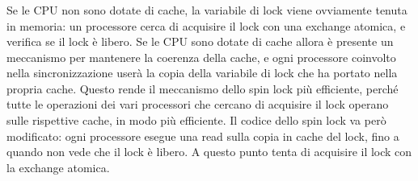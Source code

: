 \subsubsection{}
Se le CPU non sono dotate di cache, la variabile di lock viene
ovviamente tenuta in memoria: un processore cerca di acquisire il
lock con una exchange atomica, e verifica se il lock è libero. 
Se le CPU sono dotate di cache allora è presente un meccanismo per
mantenere la coerenza della cache, e ogni processore coinvolto nella
sincronizzazione userà la copia della variabile di lock che ha portato
nella propria cache.
Questo rende il meccanismo dello spin lock più efficiente, perché
tutte le operazioni dei vari processori che cercano di acquisire il
lock operano sulle rispettive cache, in modo più efficiente. Il codice dello spin lock va però modificato: ogni processore esegue
una read sulla copia in cache del lock, fino a quando non vede che il
lock è libero. A questo punto tenta di acquisire il lock con la exchange atomica.



















